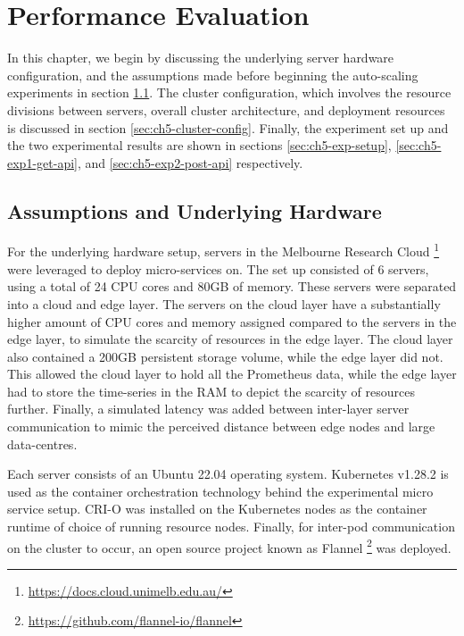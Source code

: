 \clearpage

\def\chaptertitle{Performance Evaluation}

\lhead{\emph{\chaptertitle}}

\chapter{\chaptertitle}
\label{ch:performance-evaluation}

In this chapter, we begin by discussing the underlying server hardware configuration, and the assumptions made before beginning the auto-scaling experiments in section \ref{sec:ch5-hardware-assumptions}. The cluster configuration, which involves the resource divisions between servers, overall cluster architecture, and deployment resources is discussed in section \ref{sec:ch5-cluster-config}. Finally, the experiment set up and the two experimental results are shown in sections \ref{sec:ch5-exp-setup}, \ref{sec:ch5-exp1-get-api}, and \ref{sec:ch5-exp2-post-api} respectively.

\section{Assumptions and Underlying Hardware}
\label{sec:ch5-hardware-assumptions}

For the underlying hardware setup, servers in the Melbourne Research Cloud \footnote{\url{https://docs.cloud.unimelb.edu.au/}} were leveraged to deploy micro-services on. The set up consisted of 6 servers, using a total of 24 CPU cores and 80GB of memory. These servers were separated into a cloud and edge layer. The servers on the cloud layer have a substantially higher amount of CPU cores and memory assigned compared to the servers in the edge layer, to simulate the scarcity of resources in the edge layer. The cloud layer also contained a 200GB persistent storage volume, while the edge layer did not. This allowed the cloud layer to hold all the Prometheus data, while the edge layer had to store the time-series in the RAM to depict the scarcity of resources further. Finally, a simulated latency was added between inter-layer server communication to mimic the perceived distance between edge nodes and large data-centres.\par

Each server consists of an Ubuntu 22.04 operating system. Kubernetes v1.28.2 is used as the container orchestration technology behind the experimental micro service setup. CRI-O was installed on the Kubernetes nodes as the container runtime of choice of running resource nodes. Finally, for inter-pod communication on the cluster to occur, an open source project known as Flannel \footnote{\url{https://github.com/flannel-io/flannel}} was deployed.\par

